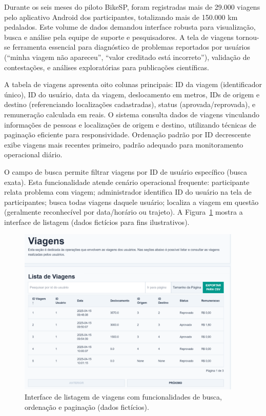 

Durante os seis meses do piloto BikeSP, foram registradas mais de 29.000 viagens pelo aplicativo Android dos participantes, totalizando mais de 150.000 km pedalados. Este volume de dados demandou interface robusta para visualização, busca e análise pela equipe de suporte e pesquisadores. A tela de viagens tornou-se ferramenta essencial para diagnóstico de problemas reportados por usuários (``minha viagem não apareceu'', ``valor creditado está incorreto''), validação de contestações, e análises exploratórias para publicações científicas.

A tabela de viagens apresenta oito colunas principais: ID da viagem (identificador único), ID do usuário, data da viagem, deslocamento em metros, IDs de origem e destino (referenciando localizações cadastradas), status (aprovada/reprovada), e remuneração calculada em reais. O sistema consulta dados de viagens vinculando informações de pessoas e localizações de origem e destino, utilizando técnicas de paginação eficiente para responsividade. Ordenação padrão por ID decrescente exibe viagens mais recentes primeiro, padrão adequado para monitoramento operacional diário.

O campo de busca permite filtrar viagens por ID de usuário específico (busca exata). Esta funcionalidade atende cenário operacional frequente: participante relata problema com viagem; administrador identifica ID do usuário na tela de participantes; busca todas viagens daquele usuário; localiza a viagem em questão (geralmente reconhecível por data/horário ou trajeto). A Figura~\ref{fig:viagens_listar} mostra a interface de listagem (dados fictícios para fins ilustrativos).

 \begin{figure}[H]
   \centering
   \includegraphics[width=0.95\textwidth]{figuras/viagens_listar.png}
   \caption{Interface de listagem de viagens com funcionalidades de busca, ordenação e paginação (dados fictícios).}
   \label{fig:viagens_listar}
 \end{figure}

